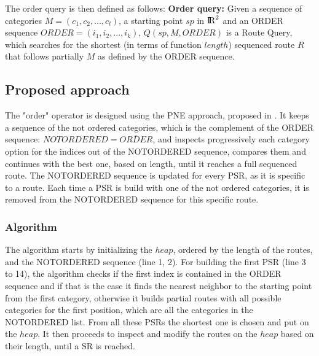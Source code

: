 The order query is then defined as follows: \newline
\textbf{Order query:} Given a sequence of categories $M = (c_1, c_2, ..., c_l)$, a starting point $sp$ in ${\rm I\!R}^2$ and an ORDER sequence $ORDER = (i_1, i_2, ..., i_k)$, $Q(sp, M, ORDER)$ is a Route Query, which searches for the shortest (in terms of function $length$) sequenced route $R$ that follows partially $M$ as defined by the ORDER sequence.


\subsection{Proposed approach} 
\label{sec:approachOrder}
The "order" operator is designed using the PNE approach, proposed in \cite{OSR}. It keeps a sequence of the not ordered categories, which is the complement of the ORDER sequence: $NOTORDERED = \overline{ORDER}$, and inspects progressively each category option for the indices out of the NOTORDERED sequence, compares them and continues with the best one, based on length, until it reaches a full sequenced route. The NOTORDERED sequence is updated for every PSR, as it is specific to a route. Each time a PSR is build with one of the not ordered categories, it is removed from the NOTORDERED sequence for this specific route.

\subsubsection{Algorithm}
\label{sec:algortihmOrder}
The algorithm \texttt{} starts by initializing the $heap$, ordered by the length of the routes, and the NOTORDERED sequence (line 1, 2). For building the first PSR (line 3 to 14), the algorithm checks if the first index is contained in the ORDER sequence and if that is the case it finds the nearest neighbor to the starting point from the first category, otherwise it builds partial routes with all possible categories for the first position, which are all the categories in the NOTORDERED list. From all these PSRs the shortest one is chosen and put on the $heap$. It then proceeds to inspect and modify the routes on the $heap$ based on their length, until a SR is reached. 

